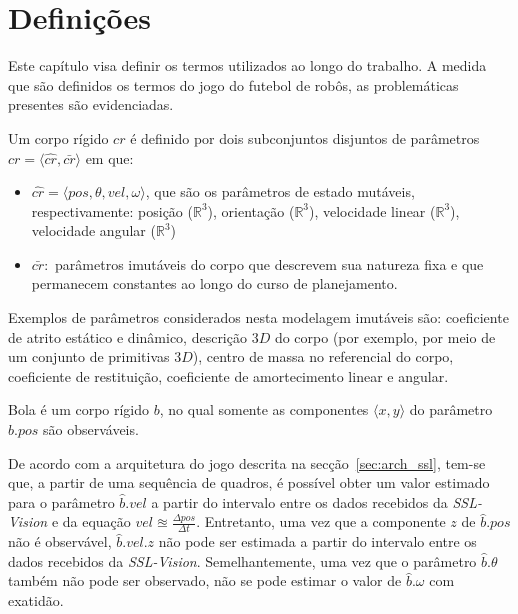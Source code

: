 \section{Definições}\label{sec:defs}

Este capítulo visa definir os termos utilizados ao longo do
trabalho. A medida que são definidos os termos do jogo do
futebol de robôs, as problemáticas presentes são evidenciadas.

\begin{defi}
  Um corpo rígido $cr$ é definido por dois subconjuntos disjuntos
  de parâmetros $cr= \langle \hat{cr}, \bar{cr} \rangle$ em que:
  \begin{itemize}
    \item $\hat{cr} = \langle pos, \theta, vel, \omega \rangle$,
    que são os parâmetros de estado mutáveis, respectivamente:
    posição ($\mathbb{R} ^{3}$), orientação ($\mathbb{R} ^{3}$),
    velocidade linear ($\mathbb{R} ^{3}$), velocidade angular
    ($\mathbb{R} ^{3}$)

    \item $\bar{cr} :$ parâmetros imutáveis do corpo que descrevem sua
    natureza fixa e que permanecem constantes ao longo do curso de 
    planejamento.
  \end{itemize}
\end{defi}

  Exemplos de parâmetros considerados nesta modelagem imutáveis são:
  coeficiente de atrito estático e dinâmico, descrição $3D$ do corpo
  (por exemplo, por meio de um conjunto de primitivas $3D$), centro de
  massa no referencial do corpo, coeficiente de restituição,
  coeficiente de amortecimento linear e angular.

\begin{defi}[Bola]\label{def:bola}
  Bola é um corpo rígido $b$, no qual somente as componentes
  $\langle x,y \rangle$ do parâmetro $\hat{b}.pos$ são
  observáveis.
\end{defi}

  De acordo com a arquitetura do jogo descrita na secção~\ref{sec:arch_ssl},
  tem-se que, a partir de uma sequência
  de quadros, é possível obter um valor estimado para o parâmetro
  $\hat{b}.vel$ a partir do intervalo entre os dados recebidos
  da \textit{SSL-Vision} e da equação $ vel \approxeq 
  \frac{\Delta pos}{\Delta t} $. Entretanto, uma vez que a componente
  $z$ de $\hat{b}.pos$ não é observável, $\hat{b}.vel.z$ 
  não pode ser estimada a partir do intervalo entre os dados recebidos
  da \textit{SSL-Vision}. Semelhantemente,  uma vez que o
  parâmetro $\hat{b}.\theta$ também não pode ser observado,
  não se pode estimar o valor de $\hat{b}.\omega$ com exatidão.

